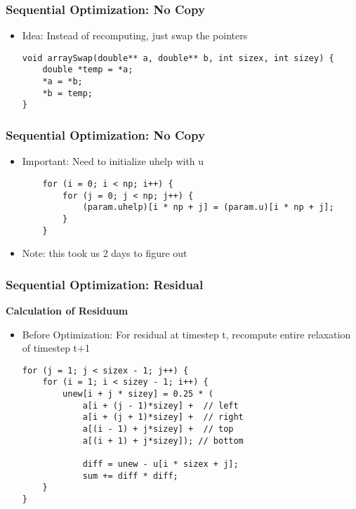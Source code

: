 \begin{frame}[fragile]
\frametitle{Sequential Optimization: No Copy}
\begin {itemize}

\item Idea: Instead of recomputing, just swap the pointers
\begin{lstlisting}
void arraySwap(double** a, double** b, int sizex, int sizey) {
	double *temp = *a;
	*a = *b;
	*b = temp;
}
\end{lstlisting}

\end {itemize}
\end{frame}

\begin{frame}[fragile]
\frametitle{Sequential Optimization: No Copy}
\begin {itemize}

\item Important: Need to initialize uhelp with u 
\begin{lstlisting}
	for (i = 0; i < np; i++) {
		for (j = 0; j < np; j++) {
			(param.uhelp)[i * np + j] = (param.u)[i * np + j];
		}
	}
\end{lstlisting}
\item Note: this took us 2 days to figure out

\end {itemize}
\end{frame}

\begin{frame}[fragile]
\frametitle{Sequential Optimization: Residual}

\textbf{Calculation of Residuum}
\begin {itemize}
\item Before Optimization: For residual at timestep t, recompute entire relaxation of timestep t+1
\begin{lstlisting}
for (j = 1; j < sizex - 1; j++) {
	for (i = 1; i < sizey - 1; i++) {
		unew[i + j * sizey] = 0.25 * (
			a[i + (j - 1)*sizey] +  // left
			a[i + (j + 1)*sizey] +  // right
			a[(i - 1) + j*sizey] +  // top
			a[(i + 1) + j*sizey]); // bottom
						
			diff = unew - u[i * sizex + j];
			sum += diff * diff;
	}
}
\end{lstlisting}

\end {itemize}
\end{frame}

